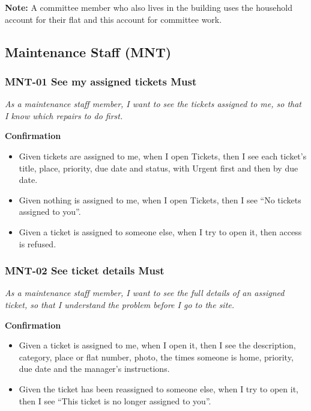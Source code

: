\documentclass[11pt,a4paper]{report}
\begin{document}
\textbf{Note:} A committee member who also lives in the building uses the household account for their flat and this account for committee work.

\subsection{Maintenance Staff (MNT)}

\subsubsection*{MNT-01 \textperiodcentered{} See my assigned tickets \textperiodcentered{} Must}

\emph{As a maintenance staff member, I want to see the tickets assigned to me, so that I know which repairs to do first.}

\medskip\noindent\textbf{Confirmation}\par

\begin{itemize}
  \item Given tickets are assigned to me, when I open Tickets, then I see each ticket's title, place, priority, due date and status, with Urgent first and then by due date.
  \item Given nothing is assigned to me, when I open Tickets, then I see ``No tickets assigned to you''.
  \item Given a ticket is assigned to someone else, when I try to open it, then access is refused.
\end{itemize}

\subsubsection*{MNT-02 \textperiodcentered{} See ticket details \textperiodcentered{} Must}

\emph{As a maintenance staff member, I want to see the full details of an assigned ticket, so that I understand the problem before I go to the site.}

\medskip\noindent\textbf{Confirmation}\par

\begin{itemize}
  \item Given a ticket is assigned to me, when I open it, then I see the description, category, place or flat number, photo, the times someone is home, priority, due date and the manager's instructions.
  \item Given the ticket has been reassigned to someone else, when I try to open it, then I see ``This ticket is no longer assigned to you''.
\end{itemize}
\end{document}

